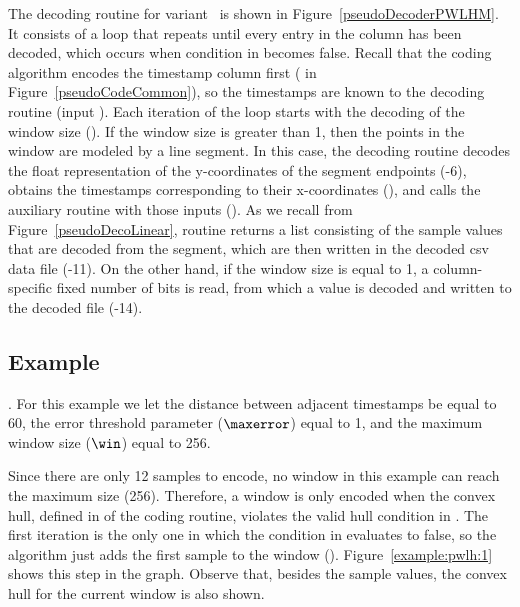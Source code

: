 \clearpage


The decoding routine for variant \maskalgo\ is shown in Figure~\ref{pseudoDecoderPWLHM}. It consists of a loop that repeats until every entry in the column has been decoded, which occurs when condition in  becomes false. Recall that the coding algorithm encodes the timestamp column first ( in Figure~\ref{pseudoCodeCommon}), so the timestamps are known to the decoding routine (input \tscol). Each iteration of the loop starts with the decoding of the window size (). If the window size is greater than 1, then the points in the window are modeled by a line segment. In this case, the decoding routine decodes the float representation of the y-coordinates of the segment endpoints (-6), obtains the timestamps corresponding to their x-coordinates (), and calls the auxiliary routine \decodeSegment with those inputs (). As we recall from Figure~\ref{pseudoDecoLinear}, routine \decodeSegment returns a list consisting of the sample values that are decoded from the segment, which are then written in the decoded csv data file (-11). On the other hand, if the window size is equal to 1, a column-specific fixed number of bits is read, from which a value is decoded and written to the decoded file (-14).







\subsection{Example}
\label{algo:pwlh:example}
\newcommand{\exampleIntro}[1]{\exampleIntroFirst{#1}. For this example we let the distance between adjacent timestamps be equal to 60, the error threshold parameter ($\maxerror$) equal to 1, and the maximum window size ($\win$) equal to 256.}


\exampleIntro{\ref{example:pwlh:1}}


\clearpage


Since there are only 12 samples to encode, no window in this example can reach the maximum size (256). Therefore, a window is only encoded when the convex hull, defined in  of the coding routine, violates the valid hull condition in . The first iteration is the only one in which the condition in  evaluates to false, so the algorithm just adds the first sample to the window (). Figure~\ref{example:pwlh:1} shows this step in the graph. Observe that, besides the sample values, the convex hull for the current window is also shown.


